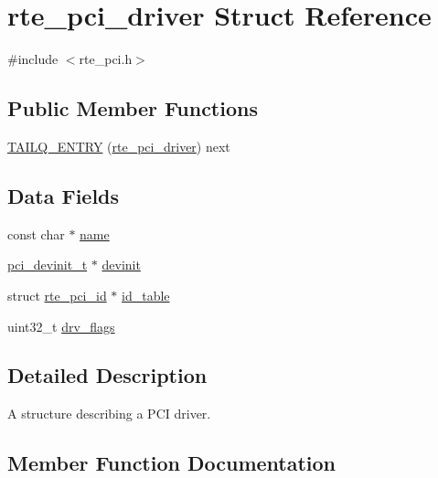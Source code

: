 \hypertarget{structrte__pci__driver}{}\section{rte\+\_\+pci\+\_\+driver Struct Reference}
\label{structrte__pci__driver}


{\ttfamily \#include $<$rte\+\_\+pci.\+h$>$}

\subsection*{Public Member Functions}
\begin{DoxyCompactItemize}
\item 
\hyperlink{structrte__pci__driver_acf212c2e96f52c9134d8c94b4dd1b180}{T\+A\+I\+L\+Q\+\_\+\+E\+N\+T\+R\+Y} (\hyperlink{structrte__pci__driver}{rte\+\_\+pci\+\_\+driver}) next
\end{DoxyCompactItemize}
\subsection*{Data Fields}
\begin{DoxyCompactItemize}
\item 
const char $\ast$ \hyperlink{structrte__pci__driver_a8f8f80d37794cde9472343e4487ba3eb}{name}
\item 
\hyperlink{rte__pci_8h_a4c670512f0269aa83c91d07d69c225a2}{pci\+\_\+devinit\+\_\+t} $\ast$ \hyperlink{structrte__pci__driver_ac9bd85320f9b0ed65539f7278ce33caf}{devinit}
\item 
struct \hyperlink{structrte__pci__id}{rte\+\_\+pci\+\_\+id} $\ast$ \hyperlink{structrte__pci__driver_aa7e565f10b0eb9a4491cf9b138aeaf70}{id\+\_\+table}
\item 
uint32\+\_\+t \hyperlink{structrte__pci__driver_adc894d0a18d680eb0e198ba13a00ffcb}{drv\+\_\+flags}
\end{DoxyCompactItemize}


\subsection{Detailed Description}
A structure describing a P\+C\+I driver. 

\subsection{Member Function Documentation}
\hypertarget{structrte__pci__driver_acf212c2e96f52c9134d8c94b4dd1b180}{}
